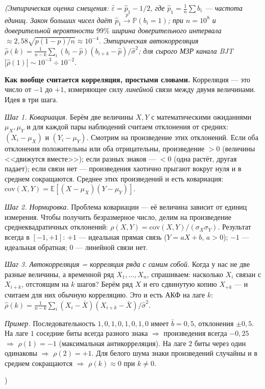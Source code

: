 \documentclass[12pt,a4paper]{extarticle}
\newcommand{\note}[1]{%
  \par
  {\small\color{noteclr}\itshape (#1)}%
  \par}
\begin{document}
\note{Эмпирическая оценка смещения: $\hat\varepsilon = \hat{p}_1 - 1/2$, где
$\hat{p}_1 = \frac{1}{n}\sum b_i$ --- частота единиц. Закон больших чисел
даёт $\hat{p}_1\xrightarrow{p}\mathbb{P}(b_i{=}1)$; при $n=10^8$ и
доверительной вероятности $99\%$ ширина доверительного интервала
$\approx 2{,}58\sqrt{p(1-p)/n}\approx 10^{-4}$. Эмпирическая автокорреляция
$\hat\rho(k)=\frac{1}{n-k}\sum_i(b_i-\hat{p})(b_{i+k}-\hat{p})/\hat\sigma^2$;
для сырого МЗР канала BJT $|\hat\rho(1)|\sim 10^{-3}\div 10^{-2}$.

\medskip
\textbf{Как вообще считается корреляция, простыми словами.}
Корреляция --- это число от $-1$ до $+1$, измеряющее силу \emph{линейной}
связи между двумя величинами. Идея в три шага.

\emph{Шаг 1. Ковариация.} Берём две величины $X, Y$ с математическими
ожиданиями $\mu_X, \mu_Y$ и для каждой пары наблюдений считаем отклонения
от средних: $(X_i - \mu_X)$ и $(Y_i - \mu_Y)$. Смотрим на произведение
этих отклонений. Если оба отклонения положительны или оба отрицательны,
произведение $>0$ (величины <<движутся вместе>>); если разных знаков ---
$<0$ (одна растёт, другая падает); если связи нет --- произведения хаотично
прыгают вокруг нуля и в среднем сокращаются. Среднее этих произведений и
есть ковариация: $\mathrm{cov}(X,Y) = \mathbb{E}[(X-\mu_X)(Y-\mu_Y)]$.

\emph{Шаг 2. Нормировка.} Проблема ковариации --- её величина зависит от
единиц измерения. Чтобы получить безразмерное число, делим на произведение
среднеквадратичных отклонений: $\rho(X,Y) =
\mathrm{cov}(X,Y)/(\sigma_X\sigma_Y)$. Результат всегда в $[-1,+1]$:
$+1$ --- идеальная прямая связь ($Y=aX+b$, $a>0$); $-1$ --- идеальная
обратная; $0$ --- линейной связи нет.

\emph{Шаг 3. Автокорреляция = корреляция ряда с самим собой.} Когда у нас
не две разные величины, а временной ряд $X_1,\ldots,X_n$, спрашиваем:
насколько $X_i$ связан с $X_{i+k}$, отстоящим на $k$ шагов? Берём ряд $X$
и его сдвинутую копию $X_{+k}$ --- и считаем для них обычную корреляцию.
Это и есть АКФ на лаге $k$:
$\hat\rho(k) = \frac{1}{n-k}\sum_i(X_i-\bar X)(X_{i+k}-\bar X)/\hat\sigma^2$.

\emph{Пример.} Последовательность $1,0,1,0,1,0,1,0$ имеет $\bar b = 0{,}5$,
отклонения $\pm 0{,}5$. На лаге $1$ соседние биты всегда разного знака
$\Rightarrow$ произведения всегда $-0{,}25$ $\Rightarrow$ $\rho(1)=-1$
(максимальная антикорреляция). На лаге $2$ биты через один одинаковы
$\Rightarrow$ $\rho(2)=+1$. Для белого шума знаки произведений случайны и в
среднем сокращаются $\Rightarrow$ $\rho(k)\approx 0$ при $k\neq 0$.

}
\end{document}

